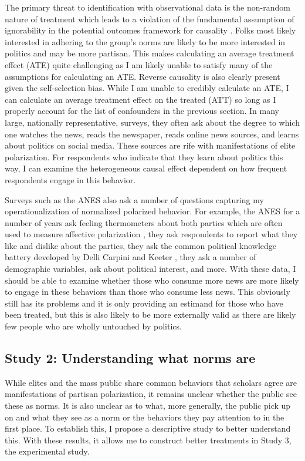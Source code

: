 \documentclass [12pt]{article}
\begin{document}
The primary threat to identification with observational data is the non-random nature of treatment which leads to a violation of the fundamental assumption of ignorability in the potential outcomes framework for causality \citep[see][]{morgan_winship_2014, cunningham_2020}. Folks most likely interested in adhering to the group's norms are likely to be more interested in politics and may be more partisan. This makes calculating an average treatment effect (ATE) quite challenging as I am likely unable to satisfy many of the assumptions for calculating an ATE. Reverse causality is also clearly present given the self-selection bias. While I am unable to credibly calculate an ATE, I can calculate an average treatment effect on the treated (ATT) so long as I properly account for the list of confounders in the previous section. In many large, nationally representative, surveys, they often ask about the degree to which one watches the news, reads the newspaper, reads online news sources, and learns about politics on social media. These sources are rife with manifestations of elite polarization. For respondents who indicate that they learn about politics this way, I can examine the heterogeneous causal effect dependent on how frequent respondents engage in this behavior.

Surveys such as the ANES also ask a number of questions capturing my operationalization of normalized polarized behavior. For example, the ANES for a number of years ask feeling thermometers about both parties which are often used to measure affective polarization \citep{iyengar_et-al_2012}, they ask respondents to report what they like and dislike about the parties, they ask the common political knowledge battery developed by Delli Carpini and Keeter \citeyearpar{delli-carpini_keeter_1996}, they ask a number of demographic variables, ask about political interest, and more. With these data, I should be able to examine whether those who consume more news are more likely to engage in these behaviors than those who consume less news. This obviously still has its problems and it is only providing an estimand for those who have been treated, but this is also likely to be more externally valid as there are likely few people who are wholly untouched by politics.


\subsection{Study 2: Understanding what norms are}

While elites and the mass public share common behaviors that scholars agree are manifestations of partisan polarization, it remains unclear whether the public see these as norms. It is also unclear as to what, more generally, the public pick up on and what they see as a norm or the behaviors they pay attention to in the first place. To establish this, I propose a descriptive study to better understand this. With these results, it allows me to construct better treatments in Study 3, the experimental study. 
\end{document}
